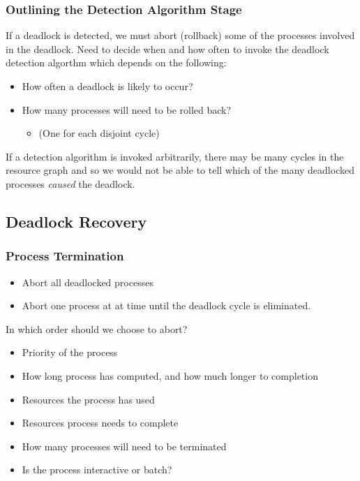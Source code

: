 \documentclass{article}%
\begin{document}
\subsubsection{Outlining the Detection Algorithm Stage}
\label{sec:org2b2a75d}
If a deadlock is  detected, we must abort (rollback) some of the processes involved in the deadlock.
Need to decide when and how often to invoke the deadlock detection algorthm which depends on the following:
\begin{itemize}
\item How often a deadlock is likely to occur?
\item How many processes will need to be rolled back?
\begin{itemize}
\item (One for each disjoint cycle)
\end{itemize}
\end{itemize}

If a detection algorithm is invoked arbitrarily, there may be many cycles in the resource graph and so we would not be able to tell which of the many deadlocked processes \emph{caused} the deadlock.

\subsection{Deadlock Recovery}
\label{sec:org39ec003}
\subsubsection{Process Termination}
\label{sec:orge38a333}
\begin{itemize}
\item Abort all deadlocked processes
\item Abort one process at at time until the deadlock cycle is eliminated.
\end{itemize}

In which order should we choose to abort?
\begin{itemize}
\item Priority of the process
\item How long process has computed, and how much longer to completion
\item Resources the process has used
\item Resources process needs to complete
\item How many processes will need to be terminated
\item Is the process interactive or batch?
\end{itemize}
\end{document}
